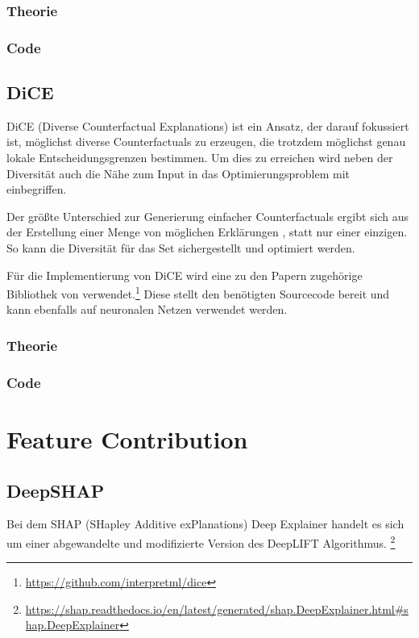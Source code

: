 \subsubsection{Theorie}
\label{subsubsection: CF Theorie}

\subsubsection{Code}
\label{subsubsection: CF Code}

\subsection{DiCE}
\label{subsection: Dice}
DiCE (Diverse Counterfactual Explanations) ist ein Ansatz, der darauf fokussiert ist, möglichst diverse Counterfactuals zu erzeugen, die trotzdem möglichst genau lokale Entscheidungsgrenzen bestimmen. \cite{MothilalDiCE} Um dies zu erreichen wird neben der Diversität auch die Nähe zum Input in das Optimierungsproblem mit einbegriffen.


Der größte Unterschied zur Generierung einfacher Counterfactuals ergibt sich aus der Erstellung einer Menge von möglichen Erklärungen \cite{MothilalDiCE}, statt nur einer einzigen. \cite{MahajanDiCe} So kann die Diversität für das Set sichergestellt und optimiert werden. \cite{MothilalDiCE}


Für die Implementierung von DiCE wird eine zu den Papern \cite{MothilalDiCE, MahajanDiCe} zugehörige Bibliothek von verwendet.\footnote{\url{https://github.com/interpretml/dice}} Diese stellt den benötigten Sourcecode bereit und kann ebenfalls auf neuronalen Netzen verwendet werden.


\subsubsection{Theorie}
\label{subsubsection: Dice Theorie}

\subsubsection{Code}
\label{subsubsection: Dice Code}


\section{Feature Contribution}
\label{section: 3.Feature Contribution}

\subsection{DeepSHAP}
\label{subsection: DeepSHAP}
Bei dem SHAP (SHapley Additive exPlanations) Deep Explainer handelt es sich um einer abgewandelte und modifizierte Version des DeepLIFT Algorithmus. \footnote{\url{https://shap.readthedocs.io/en/latest/generated/shap.DeepExplainer.html\#shap.DeepExplainer}} 

